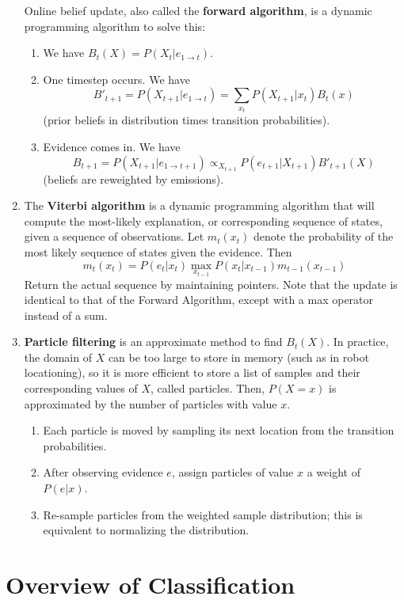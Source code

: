 \documentclass[10pt]{article}
\begin{document}
\begin{multicols}{2}
\begin{addmargin}[0.8em]{0.5em}
\begin{enumerate}[label=(\alph*)]
        Online belief update, also called the \textbf{forward algorithm}, is a dynamic programming algorithm to solve this:
        \begin{enumerate}
            \item We have $B_t(X)=P(X_t | e_{1 \rightarrow t})$.
            \item One timestep occurs. We have $$B'_{t+1}=P(X_{t+1} | e_{1 \rightarrow t}) = \sum_{x_t} P(X_{t+1} | x_t)B_t(x)$$ (prior beliefs in distribution times transition probabilities).
            \item Evidence comes in. We have $$B_{t+1}=P(X_{t+1} | e_{1 \rightarrow t+1}) \propto_{X_{t+1}} P(e_{t+1} | X_{t+1}) B'_{t+1}(X)$$ (beliefs are reweighted by emissions).
        \end{enumerate}
        \item The \textbf{Viterbi algorithm} is a dynamic programming algorithm that will compute the most-likely explanation, or corresponding sequence of states, given a sequence of observations. Let $m_t(x_t)$ denote the probability of the most likely sequence of states given the evidence. Then $$m_t(x_t) = P(e_t | x_t) \max_{x_{t-1}}P(x_t | x_{t-1})m_{t-1}(x_{t-1})$$
        Return the actual sequence by maintaining pointers. Note that the update is identical to that of the Forward Algorithm, except with a max operator instead of a sum.
        \item \textbf{Particle filtering} is an approximate method to find $B_t(X)$. In practice, the domain of $X$ can be too large to store in memory (such as in robot locationing), so it is more efficient to store a list of samples and their corresponding values of $X$, called particles. Then, $P(X=x)$ is approximated by the number of particles with value $x$.
        \begin{enumerate}[label=\roman*.]
            \item Each particle is moved by sampling its next location from the transition probabilities. 
            \item After observing evidence $e$, assign particles of value $x$ a weight of $P(e|x)$. 
            \item Re-sample particles from the weighted sample distribution; this is equivalent to normalizing the distribution. 
        \end{enumerate}
    \end{enumerate}
\end{addmargin}

\section{Overview of Classification}
\begin{addmargin}[0.8em]{0.5em}

\end{addmargin}
\end{multicols}
\end{document}

